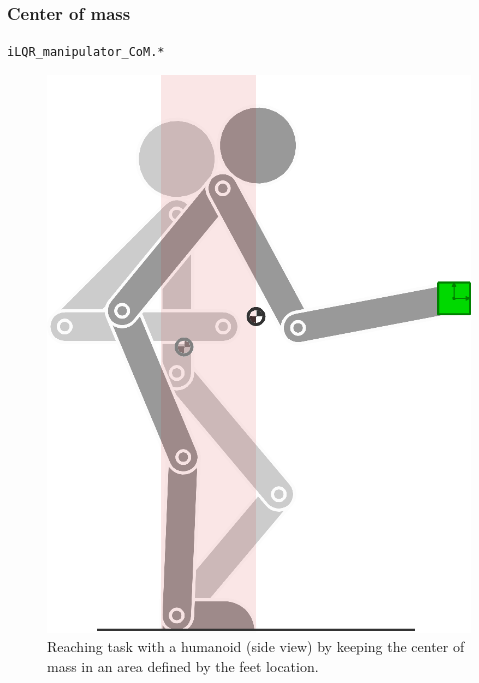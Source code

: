 \documentclass[10pt,a4paper]{article} %
\newcommand{\filename}[1]{\colorbox{rr2}{\color{white}\texttt{#1}}}
\begin{document}
\subsubsection{Center of mass}
\begin{flushright}
\filename{iLQR\_manipulator\_CoM.*}
\end{flushright}



\begin{figure}
\centering
\includegraphics[width=.28\textwidth]{images/iLQR_CoM01.png}
\caption{\footnotesize
Reaching task with a humanoid (side view) by keeping the center of mass in an area defined by the feet location. 
}
\label{fig:iLQR_CoM}
\vspace{-20pt}
\end{figure}
\end{document}
